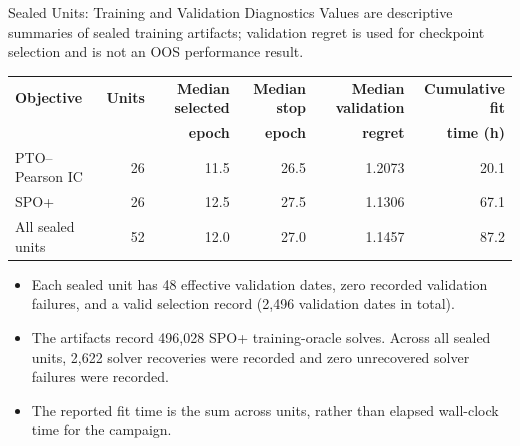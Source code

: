 \documentclass[aspectratio=169,xcolor=dvipsnames]{beamer}
\begin{document}
\begin{frame}{Sealed Units: Training and Validation Diagnostics}
    \small
    Values are descriptive summaries of sealed training artifacts; validation
    regret is used for checkpoint selection and is not an OOS performance result.
    \vspace{3pt}
    \begin{table}
        \centering
        \scriptsize
        \setlength{\tabcolsep}{4pt}
        \begin{tabular}{l r r r r r}
            \toprule
            \textbf{Objective} & \textbf{Units} & \textbf{Median selected} & \textbf{Median stop} & \textbf{Median validation} & \textbf{Cumulative fit} \\
            & & \textbf{epoch} & \textbf{epoch} & \textbf{regret} & \textbf{time (h)} \\
            \midrule
            PTO--Pearson IC & 26 & 11.5 & 26.5 & 1.2073 & 20.1 \\
            SPO+ & 26 & 12.5 & 27.5 & 1.1306 & 67.1 \\
            \midrule
            All sealed units & 52 & 12.0 & 27.0 & 1.1457 & 87.2 \\
            \bottomrule
        \end{tabular}
    \end{table}
    \vspace{2pt}
    \begin{itemize}
        \item Each sealed unit has 48 effective validation dates, zero recorded
        validation failures, and a valid selection record (2,496 validation dates in total).
        \item The artifacts record 496,028 SPO+ training-oracle solves. Across all
        sealed units, 2,622 solver recoveries were recorded and zero unrecovered
        solver failures were recorded.
        \item The reported fit time is the sum across units, rather than elapsed
        wall-clock time for the campaign.
    \end{itemize}
\end{frame}
\end{document}
